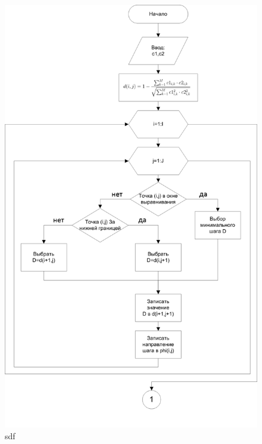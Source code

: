 \documentclass[a4paper,14pt,russian,utf8,nocolumnsxix,nocolumnxxxi,nocolumnxxxii]{eskdtext}
\begin{document}
\begin{figure}[htb]
\begin{center}
\includegraphics[width=150mm]{block1.png}
\caption[]{sdf}
\end{center}
\end{figure}
\end{document}
